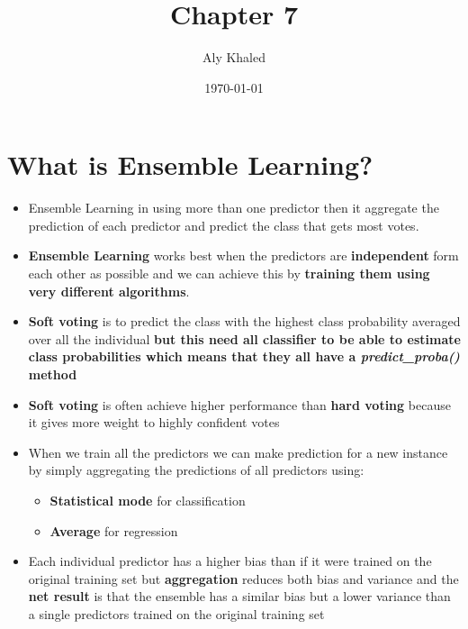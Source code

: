 \documentclass{article}
\title{Chapter 7}
\author{Aly Khaled}
\date{\today}
\begin{document}
 
    \maketitle
    \section{What is Ensemble Learning?}
    \begin{itemize}
    \item Ensemble Learning in using more than one predictor then it aggregate the prediction of each predictor and predict the class that gets most votes. 
    \item \textbf{Ensemble Learning} works best when the predictors are \textbf{independent} form each other as possible and we can achieve this by \textbf{training them using very different algorithms}.
    \item \textbf{Soft voting} is to predict the class with the highest class probability averaged over all the individual \textbf{but this need all classifier to be able to estimate class probabilities which means that they all have a \textit{predict\_proba()} method}
    \item \textbf{Soft voting} is often achieve higher performance than \textbf{hard voting} because it gives more weight to highly confident votes
    \item When we train all the predictors we can make prediction for a new instance by simply aggregating the predictions of all predictors using:
    	\begin{itemize}
    		\item \textbf{Statistical mode} for classification
    		\item \textbf{Average} for regression 
    	\end{itemize}
    \item Each individual predictor has a higher bias than if it were trained on the original training set but \textbf{aggregation} reduces both bias and variance and the \textbf{net result} is that the ensemble has a similar bias but a lower variance than a single predictors trained on the original training set
    \end{itemize}
   
\end{document}
